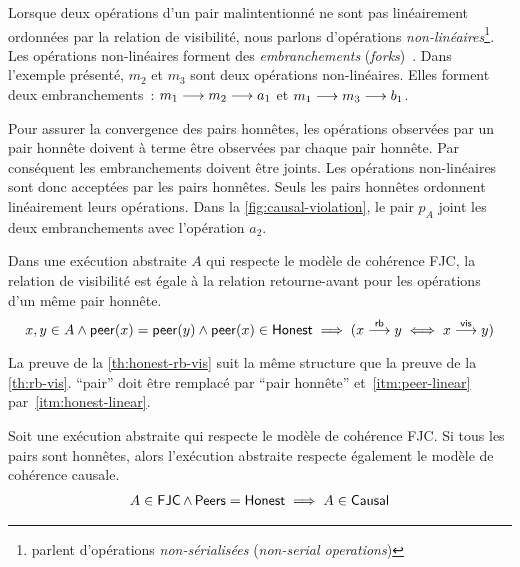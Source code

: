 Lorsque deux opérations d'un pair malintentionné ne sont pas linéairement ordonnées par la relation de visibilité, nous parlons d'opérations \emph{non-linéaires}\footnote{\textcite{mahajan_2011_cac} parlent d'opérations \emph{non-sérialisées} (\emph{non-serial operations})}.
Les opérations non-linéaires forment des \emph{embranchements} (\emph{forks})~\autocite{li_2004_sundr}.
Dans l'exemple présenté, $m_2$ et $m_3$ sont deux opérations non-linéaires. Elles forment deux embranchements~: $m_1 \longrightarrow m_2 \longrightarrow a_1$ et $m_1 \longrightarrow m_3 \longrightarrow b_1$.

Pour assurer la convergence des pairs honnêtes, les opérations observées par un pair honnête doivent à terme être observées par chaque pair honnête.
Par conséquent les embranchements doivent être joints.
Les opérations non-linéaires sont donc acceptées par les pairs honnêtes.
Seuls les pairs honnêtes ordonnent linéairement leurs opérations.
Dans la \autoref{fig:causal-violation}, le pair $p_A$ joint les deux embranchements avec l'opération $a_2$.

\begin{proposition}\label{th:honest-rb-vis}
Dans une exécution abstraite $A$ qui respecte le modèle de cohérence \ac{FJC}, la relation de visibilité est égale à la relation retourne-avant pour les opérations d'un même pair honnête.
\begin{equation*}
    x, y \in A \land \operatorname{\mathsf{peer}}(x) = \operatorname{\mathsf{peer}}(y) \land \operatorname{\mathsf{peer}}(x) \in \operatorname{\mathsf{Honest}} \implies (x \overset{\mathsf{rb}}{\longrightarrow} y \iff x \overset{\mathsf{vis}}{\longrightarrow} y)
\end{equation*}
\end{proposition}

La preuve de la \autoref{th:honest-rb-vis} suit la même structure que la preuve de la \autoref{th:rb-vis}.
\enquote{pair} doit être remplacé par \enquote{pair honnête} et~\ref{itm:peer-linear} par~\ref{itm:honest-linear}.

\begin{proposition}\label{th:causal-fjc}
Soit une exécution abstraite qui respecte le modèle de cohérence \ac{FJC}.
Si tous les pairs sont honnêtes, alors l'exécution abstraite respecte également le modèle de cohérence causale.
\begin{equation*}\begin{split}
    A \in \operatorname{\mathsf{FJC}} \land \operatorname{\mathsf{Peers}} = \operatorname{\mathsf{Honest}} \implies A \in \operatorname{\mathsf{Causal}}
\end{split}\end{equation*}
\end{proposition}

